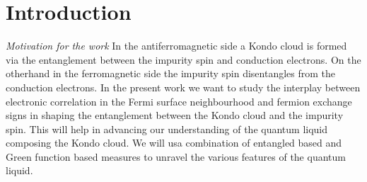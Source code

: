 \documentclass[aps,prl,preprint,groupedaddress]{revtex4-2}
\begin{document}
\section{Introduction}
\emph{Motivation for the work} In the antiferromagnetic side a Kondo cloud is formed via the entanglement between the impurity spin and conduction electrons. On the otherhand in the ferromagnetic side the impurity spin disentangles from the conduction electrons. In the present work we want to study the interplay between electronic correlation in the Fermi surface neighbourhood and fermion exchange
signs in shaping the entanglement between the Kondo cloud and the impurity spin. This will help in advancing our understanding of the quantum liquid composing the Kondo cloud. We will usa  combination of entangled based and Green function based measures to unravel the various features of the quantum liquid.
\end{document}
